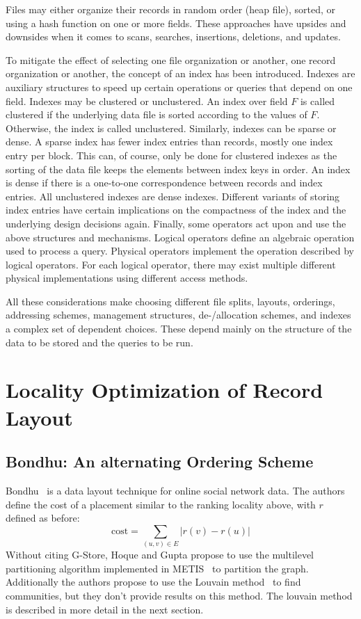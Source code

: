     Files may either organize their records in random order (heap file), sorted, or using a hash function on one or more fields. 
    These approaches have upsides and downsides when it comes to scans, searches, insertions, deletions, and updates. 

    To mitigate the effect of selecting one file organization or another, one record organization or another, the concept of an index has been introduced. 
    Indexes are auxiliary structures to speed up certain operations or queries that depend on one field. 
    Indexes may be clustered or unclustered. 
    An index over field $F$ is called clustered if the underlying data file is sorted according to the values of $F$. 
    Otherwise, the index is called unclustered.
    Similarly, indexes can be sparse or dense. 
    A sparse index has fewer index entries than records, mostly one index entry per block. 
    This can, of course, only be done for clustered indexes as the sorting of the data file keeps the elements between index keys in order. 
    An index is dense if there is a one-to-one correspondence between records and index entries. 
    All unclustered indexes are dense indexes.
    Different variants of storing index entries have certain implications on the compactness of the index and the underlying design decisions again.
    Finally, some operators act upon and use the above structures and mechanisms. 
    Logical operators define an algebraic operation used to process a query.
    Physical operators implement the operation described by logical operators. For each logical operator, there may exist multiple different physical implementations using different access methods.

    All these considerations make choosing different file splits, layouts, orderings, addressing schemes, management structures, de-/allocation schemes, and indexes a complex set of dependent choices. 
    These depend mainly on the structure of the data to be stored and the queries to be run.
\newpage

\section{Locality Optimization of Record Layout}
    \subsection*{Bondhu: An alternating Ordering Scheme}
    Bondhu~\autocite{hoque2012disk} is a data layout technique for online social network data. 
    The authors define the cost of a placement similar to the ranking locality above, with $r$ defined as before: \[ \text{cost} = \sum_{(u, v) \in E} |r(v) - r(u)| \]   
    Without citing G-Store, Hoque and Gupta propose to use the multilevel partitioning algorithm implemented in METIS~\autocite{karypis} to partition the graph. Additionally the authors propose to use the Louvain method~\autocite{blondel2008fast} to find communities, but they don't provide results on this method. The louvain method is described in more detail in the next section. \\
    
